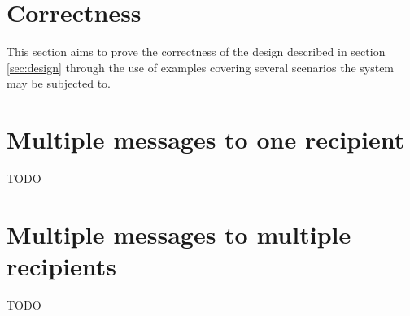 \documentclass[twocolumn]{article}
\begin{document}
\section{Correctness}
\label{sec:correctness}

This section aims to prove the correctness of the design described in section
\ref{sec:design} through the use of examples covering several scenarios the
system may be subjected to.

\section{Multiple messages to one recipient}

TODO

\section{Multiple messages to multiple recipients}

TODO
\end{document}
